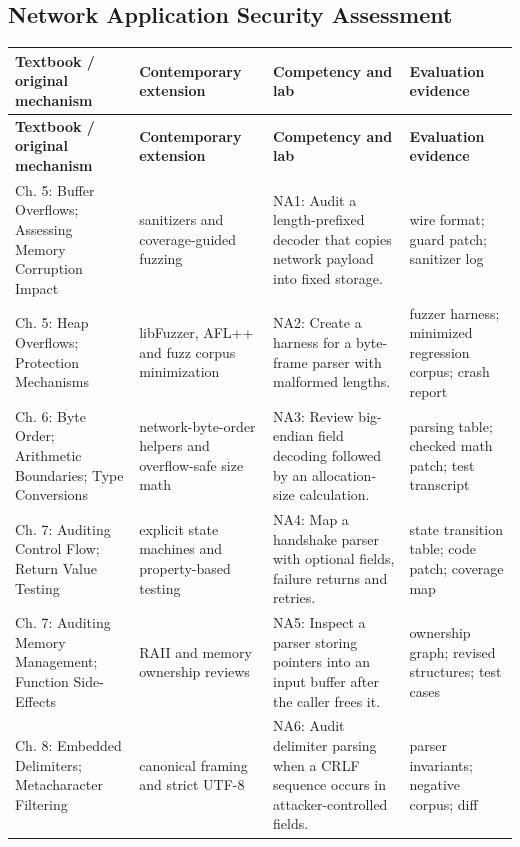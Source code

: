 \documentclass[10pt,letterpaper]{article}
\begin{document}
\subsection{Network Application Security Assessment}
\begingroup\footnotesize\setlength\tabcolsep{3pt}
\begin{longtable}{>{\raggedright\arraybackslash}p{}>{\raggedright\arraybackslash}p{}>{\raggedright\arraybackslash}p{}>{\raggedright\arraybackslash}p{}}\toprule
\textbf{Textbook / original mechanism} & \textbf{Contemporary extension} & \textbf{Competency and lab} & \textbf{Evaluation evidence}\\\midrule\endfirsthead
\toprule \textbf{Textbook / original mechanism} & \textbf{Contemporary extension} & \textbf{Competency and lab} & \textbf{Evaluation evidence}\\\midrule\endhead
Ch. 5: Buffer Overflows; Assessing Memory Corruption Impact & sanitizers and coverage-guided fuzzing & NA1: Audit a length-prefixed decoder that copies network payload into fixed storage. & wire format; guard patch; sanitizer log\\\midrule
Ch. 5: Heap Overflows; Protection Mechanisms & libFuzzer, AFL++ and fuzz corpus minimization & NA2: Create a harness for a byte-frame parser with malformed lengths. & fuzzer harness; minimized regression corpus; crash report\\\midrule
Ch. 6: Byte Order; Arithmetic Boundaries; Type Conversions & network-byte-order helpers and overflow-safe size math & NA3: Review big-endian field decoding followed by an allocation-size calculation. & parsing table; checked math patch; test transcript\\\midrule
Ch. 7: Auditing Control Flow; Return Value Testing & explicit state machines and property-based testing & NA4: Map a handshake parser with optional fields, failure returns and retries. & state transition table; code patch; coverage map\\\midrule
Ch. 7: Auditing Memory Management; Function Side-Effects & RAII and memory ownership reviews & NA5: Inspect a parser storing pointers into an input buffer after the caller frees it. & ownership graph; revised structures; test cases\\\midrule
Ch. 8: Embedded Delimiters; Metacharacter Filtering & canonical framing and strict UTF-8 & NA6: Audit delimiter parsing when a CRLF sequence occurs in attacker-controlled fields. & parser invariants; negative corpus; diff\\\midrule

\end{longtable}
\end{document}
